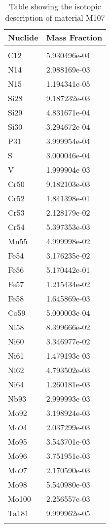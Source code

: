 \begin{centering}
\begin{longtable}[ht!]
\caption{Table showing the isotopic description of material M106}
\label{table:material_M106}
\end{longtable}\clearpage

\begin{longtable}[ht!]
{ p{} | p{} }
\hline
Nuclide & Mass Fraction\\
\hline
\\
C12 & 5.930496e-04\\
N14 & 2.988169e-03\\
N15 & 1.194341e-05\\
Si28 & 9.187232e-03\\
Si29 & 4.831671e-04\\
Si30 & 3.294672e-04\\
P31 & 3.999954e-04\\
S & 3.000046e-04\\
V & 1.999904e-03\\
Cr50 & 9.182103e-03\\
Cr52 & 1.841398e-01\\
Cr53 & 2.128179e-02\\
Cr54 & 5.397353e-03\\
Mn55 & 4.999998e-02\\
Fe54 & 3.176235e-02\\
Fe56 & 5.170442e-01\\
Fe57 & 1.215434e-02\\
Fe58 & 1.645869e-03\\
Co59 & 5.000003e-04\\
Ni58 & 8.399666e-02\\
Ni60 & 3.346977e-02\\
Ni61 & 1.479193e-03\\
Ni62 & 4.793502e-03\\
Ni64 & 1.260181e-03\\
Nb93 & 2.999993e-03\\
Mo92 & 3.198924e-03\\
Mo94 & 2.037299e-03\\
Mo95 & 3.543701e-03\\
Mo96 & 3.751951e-03\\
Mo97 & 2.170590e-03\\
Mo98 & 5.540980e-03\\
Mo100 & 2.256557e-03\\
Ta181 & 9.999962e-05\\

\caption{Table showing the isotopic description of material M107}
\label{table:material_M107}
\end{longtable}\clearpage


\end{centering}
